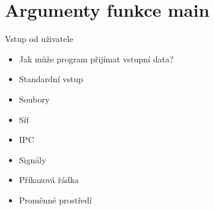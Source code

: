 

\section{Argumenty funkce main}
\frame{\sectionpage}

\begin{frame}{Vstup od uživatele}

  \begin{itemize}
    \item Jak může program přijímat vstupní data?

    \pause

    \item Standardní vstup
    \item Soubory
    \item Síť
    \item IPC
    \item Signály
    \item Příkazová řádka
    \item Proměnné prostředí
  \end{itemize}

\end{frame}

